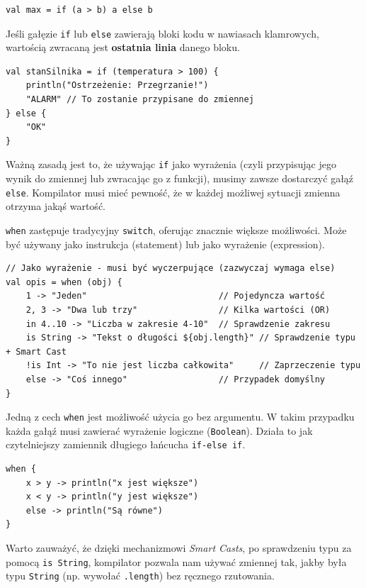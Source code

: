 \begin{verbatim}
val max = if (a > b) a else b
\end{verbatim}

Jeśli gałęzie \texttt{if} lub \texttt{else} zawierają bloki kodu w nawiasach klamrowych, wartością zwracaną jest \textbf{ostatnia linia} danego bloku.

\begin{verbatim}
val stanSilnika = if (temperatura > 100) {
    println("Ostrzeżenie: Przegrzanie!")
    "ALARM" // To zostanie przypisane do zmiennej
} else {
    "OK"
}
\end{verbatim}

Ważną zasadą jest to, że używając \texttt{if} jako wyrażenia (czyli przypisując jego wynik do zmiennej lub zwracając go z funkcji), musimy zawsze dostarczyć gałąź \texttt{else}. Kompilator musi mieć pewność, że w każdej możliwej sytuacji zmienna otrzyma jakąś wartość.

\texttt{when} zastępuje tradycyjny \texttt{switch}, oferując znacznie większe możliwości. Może być używany jako instrukcja (statement) lub jako wyrażenie (expression).

\begin{verbatim}
// Jako wyrażenie - musi być wyczerpujące (zazwyczaj wymaga else)
val opis = when (obj) {
    1 -> "Jeden"                          // Pojedyncza wartość
    2, 3 -> "Dwa lub trzy"                // Kilka wartości (OR)
    in 4..10 -> "Liczba w zakresie 4-10"  // Sprawdzenie zakresu
    is String -> "Tekst o długości ${obj.length}" // Sprawdzenie typu + Smart Cast
    !is Int -> "To nie jest liczba całkowita"     // Zaprzeczenie typu
    else -> "Coś innego"                  // Przypadek domyślny
}
\end{verbatim}

Jedną z cech \texttt{when} jest możliwość użycia go bez argumentu. W takim przypadku każda gałąź musi zawierać wyrażenie logiczne (\texttt{Boolean}). Działa to jak czytelniejszy zamiennik długiego łańcucha \texttt{if-else if}.

\begin{verbatim}
when {
    x > y -> println("x jest większe")
    x < y -> println("y jest większe")
    else -> println("Są równe")
}
\end{verbatim}

Warto zauważyć, że dzięki mechanizmowi \textit{Smart Casts}, po sprawdzeniu typu za pomocą \texttt{is String}, kompilator pozwala nam używać zmiennej tak, jakby była typu \texttt{String} (np. wywołać \texttt{.length}) bez ręcznego rzutowania.

